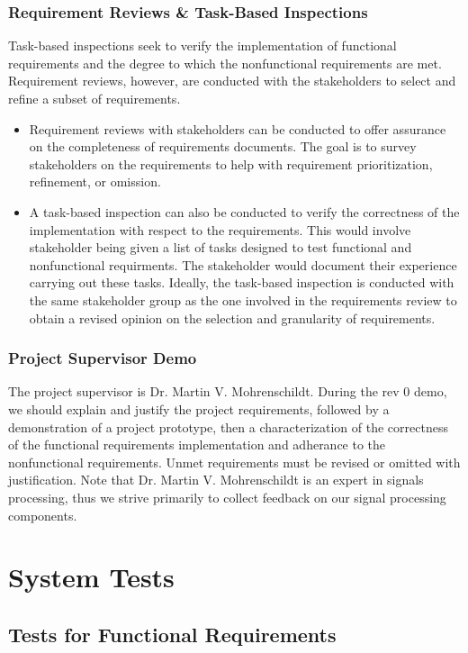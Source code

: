 \documentclass[12pt, titlepage]{article}
\begin{document}
\subsubsection{Requirement Reviews \& Task-Based Inspections}
Task-based inspections seek to verify the implementation of functional requirements and the degree to which the nonfunctional requirements are met. Requirement reviews, however, are conducted with the stakeholders to select and refine a subset of requirements.
\begin{itemize}
\item Requirement reviews with stakeholders can be conducted to offer assurance on the completeness of requirements documents. The goal is to survey stakeholders on the requirements to help with requirement prioritization, refinement, or omission.

\item A task-based inspection can also be conducted to verify the correctness of the implementation with respect to the requirements. This would involve stakeholder being given a list of tasks designed to test functional and nonfunctional requirments. The stakeholder would document their experience carrying out these tasks. Ideally, the task-based inspection is conducted with the same stakeholder group as the one involved in the requirements review to obtain a revised opinion on the selection and granularity of requirements.
\end{itemize}

\subsubsection{Project Supervisor Demo}
The project supervisor is Dr. Martin V. Mohrenschildt. During the rev 0 demo, we should explain and justify the project requirements, followed by a demonstration of a project prototype, then a characterization of the correctness of the functional requirements implementation and adherance to the nonfunctional requirements. Unmet requirements must be revised or omitted with justification. Note that Dr. Martin V. Mohrenschildt is an expert in signals processing, thus we strive primarily to collect feedback on our signal processing components.

\section{System Tests}

\subsection{Tests for Functional Requirements}
\end{document}
